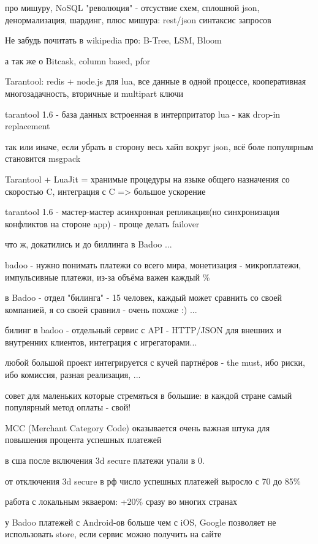   \item про мишуру, NoSQL "революция" - отсуствие схем, сплошной json, денормализация, шардинг, плюс мишура: rest/json синтаксис запросов
  \item Не забудь почитать в wikipedia про: B-Tree, LSM, Bloom
  \item а так же о Bitcask, column based, pfor
  \item Tarantool: redis + node.js для lua, все данные в одной процессе, кооперативная многозадачность, вторичные и multipart ключи
  \item tarantool 1.6 - база данных встроенная в интерпритатор lua - как drop-in replacement
  \item так или иначе, если убрать в сторону весь хайп вокруг json, всё боле популярным становится msgpack
  \item Tarantool + LuaJit = хранимые процедуры на языке общего назначения со скоростью C, интеграция с C => большое ускорение
  \item tarantool 1.6 - мастер-мастер асинхронная репликация(но синхронизация конфликтов на стороне app) - проще делать failover
  \item что ж, докатились и до биллинга в Badoo ...
  \item badoo - нужно понимать платежи со всего мира, монетизация - микроплатежи, импульсивные платежи, из-за объёма важен каждый \%
  \item в Badoo - отдел "билинга" - 15 человек, каждый может сравнить со своей компанией, я со своей сравнил - очень похоже :) ...
  \item билинг в badoo - отдельный сервис с API - HTTP/JSON для внешних и внутренних клиентов,  интеграция с игрегаторами...
  \item любой большой проект интегрируется с кучей партнёров - the must, ибо риски, ибо комиссия, разная реализация, ...
  \item совет для маленьких которые стремяться в большие: в каждой стране самый популярный метод оплаты - свой!
  \item MCC (Merchant Category Code) оказывается очень важная штука для повышения процента успешных платежей
  \item в сша после включения 3d secure платежи упали в 0. 
  \item от отключения 3d secure в рф число успешных платежей выросло с 70 до 85\% 
  \item работа с локальным экваером: +20\% сразу во многих странах
  \item у Badoo платежей с Android-ов больше чем с iOS, Google позволяет не использовать store, если сервис можно получить на сайте
